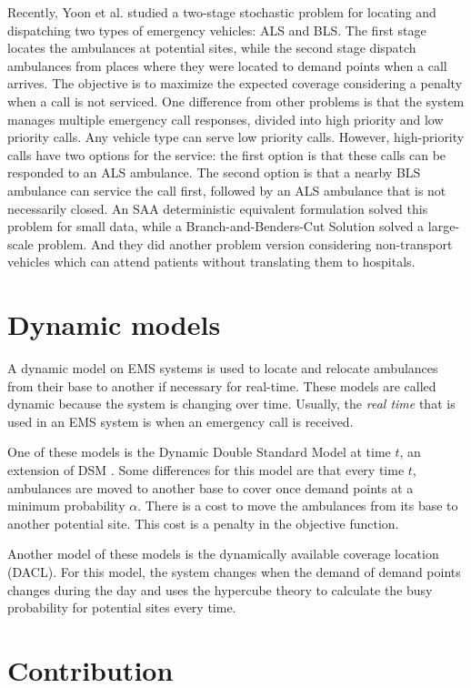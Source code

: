 Recently, Yoon et al. \cite{yoon2021stochastic} studied a two-stage stochastic problem for locating and dispatching two types of emergency vehicles: ALS and BLS. The first stage locates the ambulances at potential sites, while the second stage dispatch ambulances from places where they were located to demand points when a call arrives. The objective is to maximize the expected coverage considering a penalty when a call is not serviced. One difference from other problems is that the system manages multiple emergency call responses, divided into high priority and low priority calls. Any vehicle type can serve low priority calls. However, high-priority calls have two options for the service: the first option is that these calls can be responded to an ALS ambulance. The second option is that a nearby BLS ambulance can service the call first, followed by an ALS ambulance that is not necessarily closed. An SAA deterministic equivalent formulation solved this problem for small data, while a Branch-and-Benders-Cut Solution solved a large-scale problem. And they did another problem version considering non-transport vehicles which can attend patients without translating them to hospitals.


\section{Dynamic models}

A dynamic model on EMS systems is used to locate and relocate am\-bu\-lan\-ces from their base to another if necessary for real-time. These models are called dynamic because the system is changing over time. Usually, the \textit{real time} that is used in an EMS system is when an emergency call is received. 

One of these models is the Dynamic Double Standard Model at time $t$, an extension of DSM \cite{belanger2019recent}. Some differences for this model are that every time $t$, am\-bu\-lan\-ces are moved to another base to cover once demand points at a minimum probability $\alpha$. There is a cost to move the ambulances from its base to another potential site. This cost is a penalty in the objective function. 

Another model of these models is the dynamically available coverage location (DACL). For this model, the system changes when the demand of demand points changes during the day and uses the hypercube theory to calculate the busy pro\-ba\-bi\-li\-ty for potential sites every time. 

\section{Contribution}

